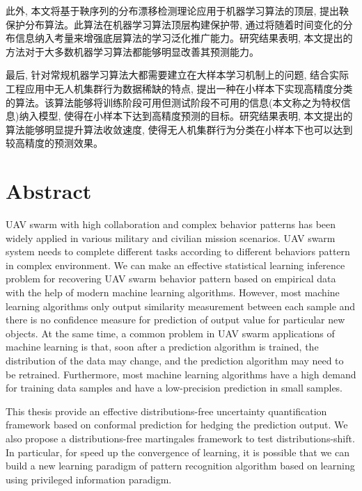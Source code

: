 此外, 本文将基于鞅序列的分布漂移检测理论应用于机器学习算法的顶层, 提出鞅保护分布算法。此算法在机器学习算法顶层构建保护带, 通过将随着时间变化的分布信息纳入考量来增强底层算法的学习泛化推广能力。研究结果表明, 本文提出的方法对于大多数机器学习算法都能够明显改善其预测能力。

最后, 针对常规机器学习算法大都需要建立在大样本学习机制上的问题, 结合实际工程应用中无人机集群行为数据稀缺的特点, 提出一种在小样本下实现高精度分类的算法。该算法能够将训练阶段可用但测试阶段不可用的信息(本文称之为特权信息)纳入模型, 使得在小样本下达到高精度预测的目标。研究结果表明, 本文提出的算法能够明显提升算法收敛速度, 使得无人机集群行为分类在小样本下也可以达到较高精度的预测效果。


\intobmk\chapter*{Abstract}%

UAV swarm with high collaboration and complex behavior patterns has been widely applied in various military and civilian mission scenarios. UAV swarm system needs to complete different tasks according to different behaviors pattern in complex environment. We can make an effective statistical learning inference problem for recovering UAV swarm behavior pattern based on empirical data with the help of modern machine learning algorithms. However, most machine learning algorithms only output similarity measurement between each sample and there is no confidence measure for prediction of output value for particular new objects. At the same time, a common problem in UAV swarm applications of machine learning is that, soon after a prediction algorithm is trained, the distribution of the data may change, and the prediction algorithm may need to be retrained. Furthermore, most machine learning algorithms have a high demand for training data samples and have a low-precision prediction in small samples.

This thesis provide an effective distributions-free uncertainty quantification framework based on conformal prediction for hedging the prediction output. We also propose a distributions-free martingales framework to test distributions-shift. In particular, for speed up the convergence of learning, it is possible that we can build a new learning paradigm of pattern recognition algorithm based on learning using privileged information paradigm. 

